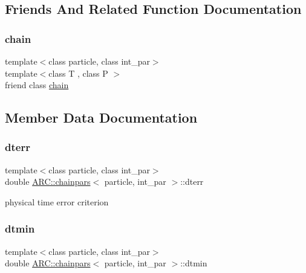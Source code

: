 \subsection{Friends And Related Function Documentation}
\hypertarget{classARC_1_1chainpars_a569feb0e3508338e81284973f08c5750}{}\label{classARC_1_1chainpars_a569feb0e3508338e81284973f08c5750} 
\subsubsection{\texorpdfstring{chain}{chain}}
{\footnotesize\ttfamily template$<$class particle, class int\+\_\+par$>$ \\
template$<$class T , class P $>$ \\
friend class \hyperlink{classARC_1_1chain}{chain}\hspace{0.3cm}{\ttfamily [friend]}}



\subsection{Member Data Documentation}
\hypertarget{classARC_1_1chainpars_aad7c1a9303c1bba721d08670961ba3f3}{}\label{classARC_1_1chainpars_aad7c1a9303c1bba721d08670961ba3f3} 
\subsubsection{\texorpdfstring{dterr}{dterr}}
{\footnotesize\ttfamily template$<$class particle, class int\+\_\+par$>$ \\
double \hyperlink{classARC_1_1chainpars}{A\+R\+C\+::chainpars}$<$ particle, int\+\_\+par $>$\+::dterr}



physical time error criterion 

\hypertarget{classARC_1_1chainpars_ae98a65b98d493759187d9790c6d746ef}{}\label{classARC_1_1chainpars_ae98a65b98d493759187d9790c6d746ef} 
\subsubsection{\texorpdfstring{dtmin}{dtmin}}
{\footnotesize\ttfamily template$<$class particle, class int\+\_\+par$>$ \\
double \hyperlink{classARC_1_1chainpars}{A\+R\+C\+::chainpars}$<$ particle, int\+\_\+par $>$\+::dtmin}



